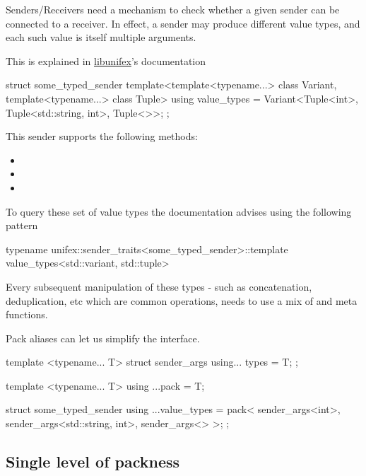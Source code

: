 \documentclass{wg21}
\begin{document}
Senders/Receivers  need a mechanism to check whether a given sender can be connected to a receiver.
In effect, a sender may produce different value types, and each such value is itself multiple arguments.

This is explained in \href{https://github.com/facebookexperimental/libunifex/blob/main/doc/concepts.md}{libunifex}'s documentation

\begin{colorblock}
    struct some_typed_sender {
        template<template<typename...> class Variant, template<typename...> class Tuple>
        using value_types = Variant<Tuple<int>,
        Tuple<std::string, int>,
        Tuple<>>;
    };
\end{colorblock}
This sender supports the following methods:
\begin{itemize}
    \item {}
    \item {}
    \item {}
\end{itemize}
To query these set of value types the documentation advises using the following pattern

\begin{colorblock}
    typename unifex::sender_traits<some_typed_sender>::template value_types<std::variant, std::tuple>
\end{colorblock}

Every subsequent manipulation of these types - such as concatenation, deduplication, etc which are common operations, needs to use a mix of  and  meta functions.

Pack aliases can let us simplify the interface.

\begin{colorblock}
    template <typename... T>
    struct sender_args {
        using... types = T;
    };

    template <typename... T>
    using ...pack = T;

    struct some_typed_sender {
        using ...value_types = pack<
            sender_args<int>,
            sender_args<std::string, int>,
            sender_args<>
        >;
    };
\end{colorblock}

\subsection{Single level of packness}
\end{document}
